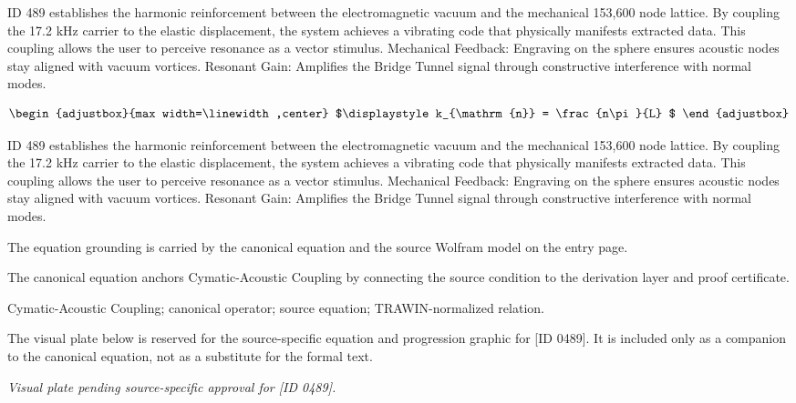 ID 489 establishes the harmonic reinforcement between the electromagnetic vacuum and the mechanical 153,600 node lattice. By coupling the 17.2 kHz carrier to the elastic displacement, the system achieves a vibrating code that physically manifests extracted data. This coupling allows the user to perceive resonance as a vector stimulus. Mechanical Feedback: Engraving on the sphere ensures acoustic nodes stay aligned with vacuum vortices. Resonant Gain: Amplifies the Bridge Tunnel signal through constructive interference with normal modes.

\[
\begin{adjustbox}{max width=\linewidth,center}
$\displaystyle
k_{\mathrm{n}} = \frac{n\pi}{L}
$
\end{adjustbox}
\]

ID 489 establishes the harmonic reinforcement between the electromagnetic vacuum and the mechanical 153,600 node lattice. By coupling the 17.2 kHz carrier to the elastic displacement, the system achieves a vibrating code that physically manifests extracted data. This coupling allows the user to perceive resonance as a vector stimulus. Mechanical Feedback: Engraving on the sphere ensures acoustic nodes stay aligned with vacuum vortices. Resonant Gain: Amplifies the Bridge Tunnel signal through constructive interference with normal modes.

The equation grounding is carried by the canonical equation and the source Wolfram model on the entry page.

The canonical equation anchors Cymatic-Acoustic Coupling by connecting the source condition to the derivation layer and proof certificate.

Cymatic-Acoustic Coupling; canonical operator; source equation; TRAWIN-normalized relation.
\endgroup

\begingroup\footnotesize\sloppy
The visual plate below is reserved for the source-specific equation and progression graphic for [ID 0489]. It is included only as a companion to the canonical equation, not as a substitute for the formal text.
\par\endgroup
\begingroup\footnotesize\itshape
Visual plate pending source-specific approval for [ID 0489].
\par\endgroup

